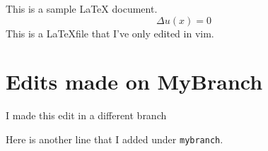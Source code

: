 \documentclass[11pt,letterpaper]{article}
\begin{document}
	This is a sample LaTeX document.
	\begin{equation} \Delta u(x)=0\end{equation}
	This is a \LaTeX file that I've only edited in vim.

	\section{Edits made on MyBranch}
	I made this edit in a different branch

	Here is another line that I added under \verb|mybranch|. 
\end{document}
